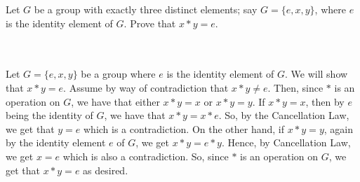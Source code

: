 Let $G$ be a group with exactly three distinct elements; say $G=\{e,x,y\}$, where $e$ is the identity
element of $G$. Prove that $x*y=e$.\\\\

\begin{solution}\renewcommand{\qedsymbol}{}\ \\
    Let $G=\{e,x,y\}$ be a group where $e$ is the identity element of $G$. We will show that $x*y=e$.
    Assume by way of contradiction that $x*y\neq e$. Then, since $*$ is an operation on $G$, we have
    that either $x*y=x$ or $x*y=y$. If $x*y=x$, then by $e$ being the identity of $G$, we have that
    $x*y=x*e$. So, by the Cancellation Law, we get that $y=e$ which is a contradiction. On the other
    hand, if $x*y=y$, again by the identity element $e$ of $G$, we get $x*y=e*y$. Hence, by Cancellation
    Law, we get $x=e$ which is also a contradiction. So, since $*$ is an operation on $G$, we get that
    $x*y=e$ as desired.

\end{solution}